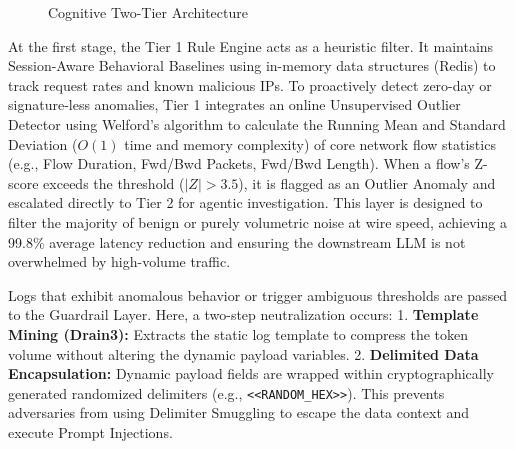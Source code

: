 \documentclass[12pt,a4paper]{article}
\begin{document}
\begin{figure}[H]
{
    }
    \caption{Cognitive Two-Tier Architecture}
    \label{fig:architecture}
\end{figure}

At the first stage, the Tier 1 Rule Engine acts as a heuristic filter. It maintains Session-Aware Behavioral Baselines using in-memory data structures (Redis) to track request rates and known malicious IPs. To proactively detect zero-day or signature-less anomalies, Tier 1 integrates an online Unsupervised Outlier Detector using Welford's algorithm to calculate the Running Mean and Standard Deviation ($O(1)$ time and memory complexity) of core network flow statistics (e.g., Flow Duration, Fwd/Bwd Packets, Fwd/Bwd Length). When a flow's Z-score exceeds the threshold ($|Z| > 3.5$), it is flagged as an Outlier Anomaly and escalated directly to Tier 2 for agentic investigation. This layer is designed to filter the majority of benign or purely volumetric noise at wire speed, achieving a 99.8\% average latency reduction and ensuring the downstream LLM is not overwhelmed by high-volume traffic.

Logs that exhibit anomalous behavior or trigger ambiguous thresholds are passed to the Guardrail Layer. Here, a two-step neutralization occurs:
1. \textbf{Template Mining (Drain3):} Extracts the static log template to compress the token volume without altering the dynamic payload variables.
2. \textbf{Delimited Data Encapsulation:} Dynamic payload fields are wrapped within cryptographically generated randomized delimiters (e.g., \verb|<<RANDOM_HEX>>|). This prevents adversaries from using Delimiter Smuggling to escape the data context and execute Prompt Injections.
\end{document}
